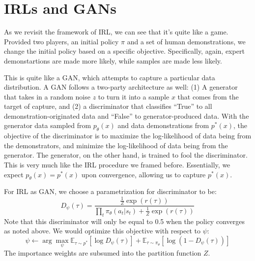 \section{IRLs and GANs}
As we revisit the framework of IRL, we can see that it's quite like a game.
Provided two players, an initial policy $\pi$ and a set of human demonstrations, we change the initial policy based on a specific objective.
Specifically, again, expert demonstartions are made more likely, while samples are made less likely.

This is quite like a GAN, which attempts to capture a particular data distribution.
A GAN follows a two-party architecture as well: (1) A generator that takes in a random noise $z$ to turn it into a sample $x$ that comes from the target of capture, and (2) a discriminator that classifies ``True'' to all demonstration-originated data and ``False'' to generator-produced data.
With the generator data sampled from $p_\theta(x)$ and data demonstrations from $p^*(x)$, the objective of the discriminator is to maximize the log-likelihood of data being from the demonstrators, and minimize the log-likelihood of data being from the generator.
The generator, on the other hand, is trained to fool the discriminator.
This is very much like the IRL procedure we framed before. Essentially, we expect $p_\theta (x) = p^*(x)$ upon convergence, allowing us to capture $p^*(x)$.

For IRL as GAN, we choose a parametrization for discriminator to be:
\[
    D_\psi (\tau) = \frac{\frac{1}{Z} \exp(r(\tau))}{\prod_t \pi_\theta (a_t | s_t) + \frac{1}{Z} \exp(r(\tau))}
\]
Note that this discriminator will only be equal to 0.5 when the policy converges as noted above.
We would optimize this objective with respect to $\psi$:
\[
    \psi \leftarrow \arg \max_\psi \mathbb{E}_{\tau \sim p^*} [\log D_\psi (\tau)] + \mathbb{E}_{\tau \sim \pi_\theta} [\log (1 - D_\psi (\tau))]
\]
The importance weights are subsumed into the partition function $Z$.
